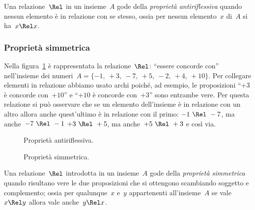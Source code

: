 \begin{definizione}
Una relazione~\(\Rel\) in un insieme~\(A\) gode della \emph{proprietà 
antiriflessiva} quando nessun elemento è in relazione con se stesso,
ossia per nessun elemento~\(x\) di~\(A\) si ha~\(x \Rel x\).
\end{definizione}

\subsubsection{Proprietà simmetrica}

\begin{exrig}
 \begin{esempio}
Nella figura~\ref{fig:B.4} è rappresentata la relazione~\(\Rel\): ``essere 
concorde con'' nell'insieme dei 
numeri~\(A = \lbrace -1,~+3,~-7,~+5,~-2,~+4,~+10 \rbrace\).
Per collegare elementi in relazione abbiamo usato archi poiché, ad esempio, le 
proposizioni ``\(+3\) è concorde con~\(+10\)'' e ``\(+10\) è concorde con~\(+3\)''
sono entrambe vere. Per questa relazione si può osservare che se un elemento 
dell'insieme è in relazione con un altro allora anche quest'ultimo
è in relazione con il primo:
\(-1~\Rel~-7\), ma anche~\(-7~\Rel~-1\) \(+3~\Rel~+5\), ma anche~\(+5~\Rel~+3\) e così 
via.
 \end{esempio}
\end{exrig}

\begin{inaccessibleblock}
 \begin{figure}[t]
\begin{minipage}[t]{.45\textwidth}
 \centering
 
 \caption{Proprietà antiriflessiva.}\label{fig:B.3}
\end{minipage}\hfil
\begin{minipage}[t]{.45\textwidth}
 \centering
 
 \caption{Proprietà simmetrica.}\label{fig:B.4}
\end{minipage}
\end{figure}
\end{inaccessibleblock}

\begin{definizione}
Una relazione~\(\Rel\) introdotta in un insieme~\(A\) gode della \emph{proprietà 
simmetrica} quando risultano vere le due proposizioni
che si ottengono scambiando soggetto e complemento; ossia per qualunque~\(x\) 
e~\(y\) appartenenti all'insieme~\(A\) se vale~\(x \Rel y\)
allora vale anche~\(y \Rel x\).
\end{definizione}

